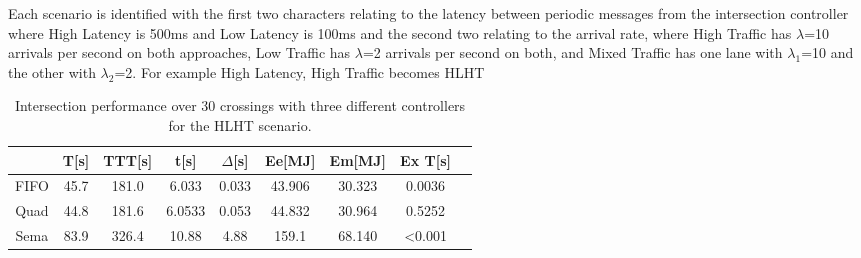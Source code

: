 Each scenario is identified with the first two characters relating to the latency between periodic messages from the intersection controller where High Latency is 500ms and  Low Latency is 100ms and the second two relating to the arrival rate, where High Traffic has $\lambda$=10 arrivals per second on both approaches, Low Traffic has $\lambda$=2 arrivals per second on both, and Mixed Traffic has one lane with $\lambda_1$=10 and the other with $\lambda_2$=2. For example High Latency, High Traffic becomes HLHT

\begin{table}
	\begin{tabular}{|c|c|c|c|c|c|c|c|c|}
		\hline
		& T[s]&TTT[s]&t[s]&$\Delta$[s]&Ee[MJ]&Em[MJ]&Ex T[s]\\
		\hline
		FIFO & 45.7 & 181.0 & 6.033 & 0.033 & 43.906 & 30.323 & 0.0036\\
		Quad & 44.8 &181.6& 6.0533 & 0.053 & 44.832 & 30.964 & 0.5252\\
		Sema & 83.9 & 326.4 & 10.88 & 4.88 & 159.1 & 68.140 & <0.001\\
		\hline
	\end{tabular}
	\label{tab:results}
	\caption{Intersection performance over 30 crossings with three different controllers for the HLHT scenario. }
\end{table}

